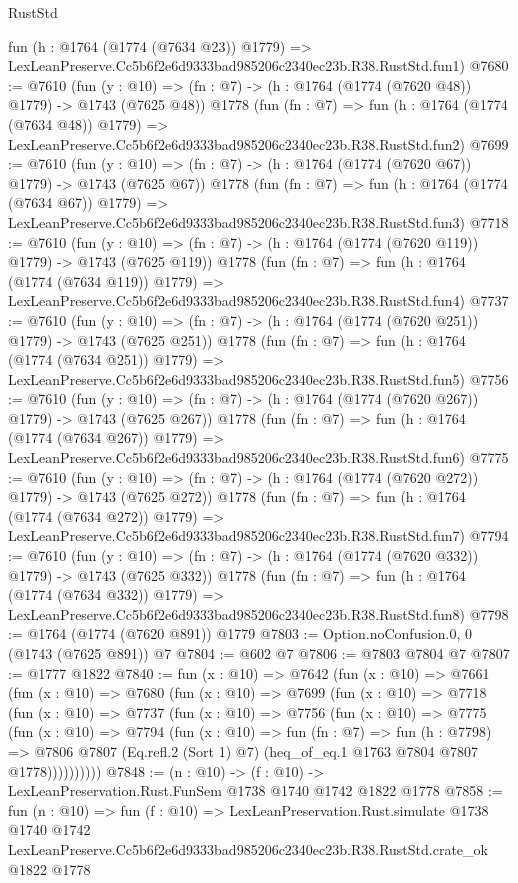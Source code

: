 \begin{lexlean}{RustStd}
\begin{coremodule}
    fun (h : @1764 (@1774 (@7634 @23)) @1779) =>
    LexLeanPreserve.Cc5b6f2e6d9333bad985206c2340ec23b.R38.RustStd.fun1)
@7680 := @7610
    (fun (y : @10) => (fn : @7) -> (h : @1764 (@1774 (@7620 @48)) @1779) -> @1743 (@7625 @48))
    @1778
    (fun (fn : @7) =>
    fun (h : @1764 (@1774 (@7634 @48)) @1779) =>
    LexLeanPreserve.Cc5b6f2e6d9333bad985206c2340ec23b.R38.RustStd.fun2)
@7699 := @7610
    (fun (y : @10) => (fn : @7) -> (h : @1764 (@1774 (@7620 @67)) @1779) -> @1743 (@7625 @67))
    @1778
    (fun (fn : @7) =>
    fun (h : @1764 (@1774 (@7634 @67)) @1779) =>
    LexLeanPreserve.Cc5b6f2e6d9333bad985206c2340ec23b.R38.RustStd.fun3)
@7718 := @7610
    (fun (y : @10) => (fn : @7) -> (h : @1764 (@1774 (@7620 @119)) @1779) -> @1743 (@7625 @119))
    @1778
    (fun (fn : @7) =>
    fun (h : @1764 (@1774 (@7634 @119)) @1779) =>
    LexLeanPreserve.Cc5b6f2e6d9333bad985206c2340ec23b.R38.RustStd.fun4)
@7737 := @7610
    (fun (y : @10) => (fn : @7) -> (h : @1764 (@1774 (@7620 @251)) @1779) -> @1743 (@7625 @251))
    @1778
    (fun (fn : @7) =>
    fun (h : @1764 (@1774 (@7634 @251)) @1779) =>
    LexLeanPreserve.Cc5b6f2e6d9333bad985206c2340ec23b.R38.RustStd.fun5)
@7756 := @7610
    (fun (y : @10) => (fn : @7) -> (h : @1764 (@1774 (@7620 @267)) @1779) -> @1743 (@7625 @267))
    @1778
    (fun (fn : @7) =>
    fun (h : @1764 (@1774 (@7634 @267)) @1779) =>
    LexLeanPreserve.Cc5b6f2e6d9333bad985206c2340ec23b.R38.RustStd.fun6)
@7775 := @7610
    (fun (y : @10) => (fn : @7) -> (h : @1764 (@1774 (@7620 @272)) @1779) -> @1743 (@7625 @272))
    @1778
    (fun (fn : @7) =>
    fun (h : @1764 (@1774 (@7634 @272)) @1779) =>
    LexLeanPreserve.Cc5b6f2e6d9333bad985206c2340ec23b.R38.RustStd.fun7)
@7794 := @7610
    (fun (y : @10) => (fn : @7) -> (h : @1764 (@1774 (@7620 @332)) @1779) -> @1743 (@7625 @332))
    @1778
    (fun (fn : @7) =>
    fun (h : @1764 (@1774 (@7634 @332)) @1779) =>
    LexLeanPreserve.Cc5b6f2e6d9333bad985206c2340ec23b.R38.RustStd.fun8)
@7798 := @1764 (@1774 (@7620 @891)) @1779
@7803 := Option.noConfusion.{0, 0} (@1743 (@7625 @891)) @7
@7804 := @602 @7
@7806 := @7803 @7804 @7
@7807 := @1777 @1822
@7840 := fun (x : @10) =>
  @7642
    (fun (x : @10) =>
    @7661
      (fun (x : @10) =>
      @7680
        (fun (x : @10) =>
        @7699
          (fun (x : @10) =>
          @7718
            (fun (x : @10) =>
            @7737
              (fun (x : @10) =>
              @7756
                (fun (x : @10) =>
                @7775
                  (fun (x : @10) =>
                  @7794
                    (fun (x : @10) =>
                    fun (fn : @7) =>
                    fun (h : @7798) =>
                    @7806
                      @7807
                      (Eq.refl.{2} (Sort 1) @7)
                      (heq_of_eq.{1} @1763 @7804 @7807 @1778))))))))))
@7848 := (n : @10) -> (f : @10) -> LexLeanPreservation.Rust.FunSem @1738 @1740 @1742 @1822 @1778
@7858 := fun (n : @10) =>
  fun (f : @10) =>
  LexLeanPreservation.Rust.simulate
    @1738
    @1740
    @1742
    LexLeanPreserve.Cc5b6f2e6d9333bad985206c2340ec23b.R38.RustStd.crate_ok
    @1822
    @1778
\end{coremodule}
\end{lexlean}
